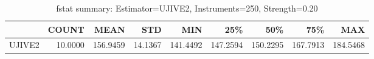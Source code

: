 \begin{table}[ht]
\centering
\caption{fstat summary: Estimator=UJIVE2, Instruments=250, Strength=0.20}
\begin{tabular}{lrrrrrrrr}
\toprule
 & COUNT & MEAN & STD & MIN & 25\% & 50\% & 75\% & MAX \\
\midrule
UJIVE2 & 10.0000 & 156.9459 & 14.1367 & 141.4492 & 147.2594 & 150.2295 & 167.7913 & 184.5468 \\
\bottomrule
\end{tabular}
\end{table}
